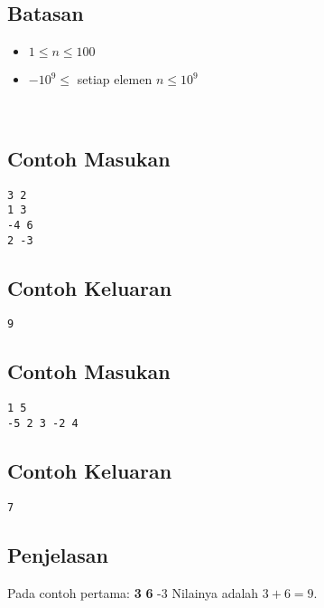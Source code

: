 \documentclass{article}
\begin{document}
\subsection*{Batasan}

\begin{itemize}
    \setlength\itemsep{0pt}
    \item $1 \leq n \leq 100$
    \item $-10^9 \leq $ setiap elemen $n \leq 10^9$
\end{itemize}
\\
\begin{multicols}{2}
\subsection*{Contoh Masukan}
\begin{lstlisting}
3 2
1 3
-4 6
2 -3
\end{lstlisting}
\columnbreak
\subsection*{Contoh Keluaran}
\begin{lstlisting}
9
\end{lstlisting}
\vfill
\null
\end{multicols}

\begin{multicols}{2}
\subsection*{Contoh Masukan}
\begin{lstlisting}
1 5
-5 2 3 -2 4
\end{lstlisting}
\columnbreak
\subsection*{Contoh Keluaran}
\begin{lstlisting}
7
\end{lstlisting}
\vfill
\null
\end{multicols}
\subsection*{Penjelasan}
Pada contoh pertama:
 \textbf{3}
 \textbf{6}
 -3
\newline
Nilainya adalah $3+6 = 9$.

\pagebreak
\end{document}
